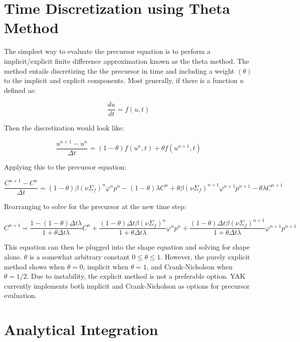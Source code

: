 \documentclass[11pt]{tamurmemo}
\newcommand{\be}{\begin{equation}}
\newcommand{\ee}{\end{equation}}
\begin{document}
\bigskip

\section{Time Discretization using Theta Method}

The simplest way to evaluate the precursor equation is to perform a implicit/explicit finite difference approximation known as the theta method.  The method entails discretizing the the precursor in time and including a weight $(\theta)$ to the implicit and explicit components.  Most generally, if there is a function $u$ defined as:

\be
\frac{du}{dt}=f(u,t)
\ee

Then the discretization would look like:

\be
\frac{u^{n+1}-u^n}{\Delta t}=(1-\theta)f(u^n,t) + \theta f(u^{n+1},t)
\ee

Applying this to the precursor equation:

\be
\frac{C^{n+1}-C^n}{\Delta t}=(1-\theta)\beta(\nu\Sigma_f)^n\varphi^n p^n-(1-\theta)\lambda C^n + \theta\beta(\nu\Sigma_f)^{n+1}\varphi^{n+1}p^{n+1}-\theta\lambda C^{n+1}
\ee

Rearranging to solve for the precursor at the new time step:

\be
C^{n+1}=\frac{1-(1-\theta)\Delta t\lambda}{1+\theta\Delta t\lambda}C^n + \frac{(1-\theta)\Delta t \beta (\nu\Sigma_f)^n}{1+\theta\Delta t\lambda}\varphi^n p^n +  \frac{(1-\theta)\Delta t \beta (\nu\Sigma_f)^{n+1}}{1+\theta\Delta t\lambda}\varphi^{n+1} p^{n+1}
\ee

This equation can then be plugged into the shape equation and solving for shape alone.  $\theta$ is a somewhat arbitrary constant $0\le\theta\le1$.  However, the purely explicit method shows when $\theta=0$, implicit when $\theta=1$, and Crank-Nicholson when $\theta=1/2$.  Due to instability, the explicit method is not a preferable option.  YAK currently implements both implicit and Crank-Nicholson as options for precursor evaluation.

\bigskip


\section{Analytical Integration}
\end{document}
